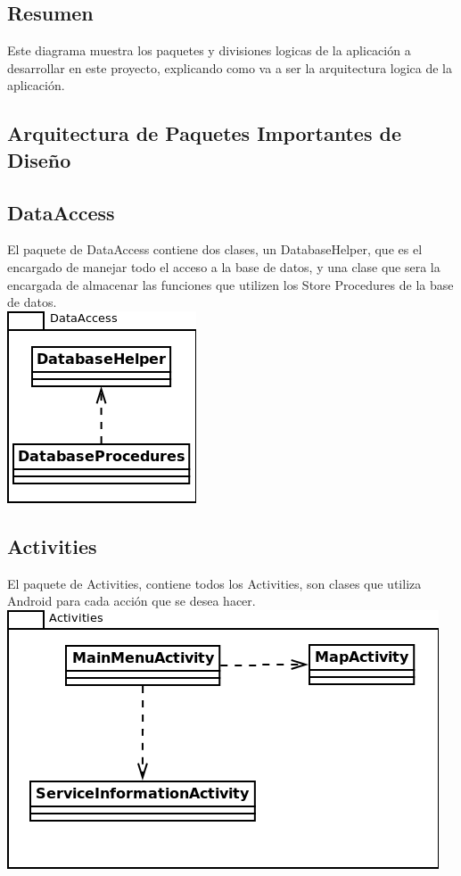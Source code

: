 \documentclass[12pt]{article}
\begin{document}
\subsection{Resumen}
Este diagrama muestra los paquetes y divisiones logicas de la aplicaci\'on a desarrollar en este proyecto, explicando como va a ser la arquitectura logica de la aplicaci\'on.

\subsection{Arquitectura de Paquetes Importantes de Dise\~no}

\subsection{DataAccess}
El paquete de DataAccess contiene dos clases, un DatabaseHelper, que es el encargado de manejar todo el acceso a la base de datos, y una clase que sera la encargada de almacenar las funciones que utilizen los Store Procedures de la base de datos.\\
\includegraphics[scale=0.5]{"../Documentos/Diagramas/DA"}

\subsection{Activities}
El paquete de Activities, contiene todos los Activities, son clases que utiliza Android para cada acci\'on que se desea hacer.\\
\includegraphics[scale=0.5]{"../Documentos/Diagramas/Act"}
\end{document}
